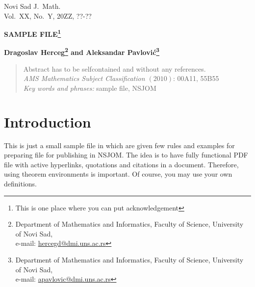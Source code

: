 \documentclass[leqno,twoside]{article}
\title{} \author{} \date{}
\numberwithin{equation}{section} %
\theoremstyle{definition}
\theoremstyle{remark}
\begin{document}
\thispagestyle{empty}

\begin{flushleft}
\vspace*{-1.1cm} {\sc  Novi Sad J.\ Math.}\\ {\sc Vol.\ XX, No.\ Y,
20ZZ, ??-??}
\end{flushleft}
\vspace{0.8cm}
\begin{center}
{\large \bf SAMPLE FILE\footnote{This is one place where you can put acknowledgement}

} \vspace*{3mm}


{\bf Dragoslav Herceg\footnote{Department of Mathematics and Informatics, Faculty of Science, University of Novi Sad,\\ e-mail: \href{mailto:hercegd@dmi.uns.ac.rs}{hercegd@dmi.uns.ac.rs}} and Aleksandar Pavlovi\'c\footnote{Department of Mathematics and Informatics, Faculty of Science, University of Novi Sad,\\ e-mail: \href{mailto:apavlovic@dmi.uns.ac.rs}{apavlovic@dmi.uns.ac.rs}}}
\end{center}

\begin{abstract}
Abstract has to be selfcontained and without any references.
\\[2mm] {\it AMS Mathematics  Subject Classification $(2010)$}: 00A11, 55B55
\\[1mm] {\it Key words and phrases:} sample file, NSJOM

\end{abstract}










\section{Introduction}

This is just a small sample file in which are given few rules and examples for preparing file for publishing in NSJOM.  The idea is to have fully functional PDF file with active hyperlinks, quotations and citations in a document. Therefore, using theorem environments is important. Of course, you may use your own definitions.
\end{document}

